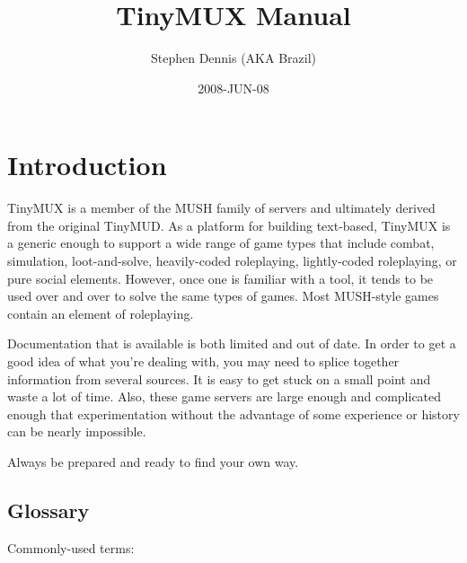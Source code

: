 \documentclass[10pt,letterpaper]{book}
\title{TinyMUX Manual}
\author{Stephen Dennis (AKA Brazil)}
\date{2008-JUN-08}
\begin{document}
\frontmatter
\maketitle
\tableofcontents

\mainmatter
\chapter{Introduction}
TinyMUX is a member of the MUSH family of servers and ultimately
derived from the original TinyMUD.
As a platform for building text-based, TinyMUX is a generic enough to support
a wide range of game types that include combat, simulation, loot-and-solve,
heavily-coded roleplaying, lightly-coded roleplaying, or pure social elements.
However, once one is familiar with a tool, it tends to be used over and over
to solve the same types of games.
Most MUSH-style games contain an element of roleplaying.

Documentation that is available is both limited and out of date. In order to
get a good idea of what you're dealing with, you may need to splice together
information from several sources. It is easy to get stuck on a small point
and waste a lot of time.  Also, these game servers are large enough and
complicated enough that experimentation without the advantage of some
experience or history can be nearly impossible.

Always be prepared and ready to find your own way.

\section{Glossary}

Commonly-used terms:
\end{document}
